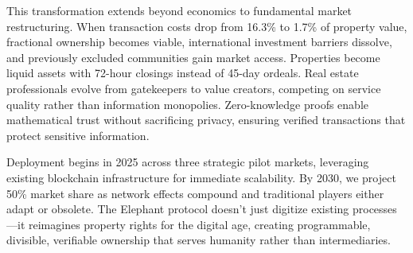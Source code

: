 This transformation extends beyond economics to fundamental market restructuring. When transaction costs drop from 16.3\% to 1.7\% of property value, fractional ownership becomes viable, international investment barriers dissolve, and previously excluded communities gain market access. Properties become liquid assets with 72-hour closings instead of 45-day ordeals. Real estate professionals evolve from gatekeepers to value creators, competing on service quality rather than information monopolies. Zero-knowledge proofs enable mathematical trust without sacrificing privacy, ensuring verified transactions that protect sensitive information.

Deployment begins in 2025 across three strategic pilot markets, leveraging existing blockchain infrastructure for immediate scalability. By 2030, we project 50\% market share as network effects compound and traditional players either adapt or obsolete. The Elephant protocol doesn't just digitize existing processes---it reimagines property rights for the digital age, creating programmable, divisible, verifiable ownership that serves humanity rather than intermediaries.